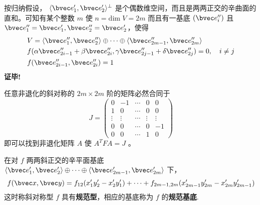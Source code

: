 按归纳假设， $\langle\bvec e'_1,\bvec e'_2\rangle^{\perp}$ 是个偶数维空间，而且是两两正交的辛曲面的直和。可知有某个整数 $m$ 使 $n=\mathrm{dim}\;V=2m$ 而且有一基底 $(\bvec e_i'')$ 且 $\bvec e''_1=\bvec e'_1,\bvec e''_2=\bvec e'_2$，使得
\begin{equation}
 \begin{aligned}
 &V=\langle\bvec e''_1,\bvec e''_2\rangle\oplus\cdots\oplus\langle\bvec e''_{2m-1},\bvec e''_{2m}\rangle\\
&f(\alpha\bvec e''_{2i-1}+\beta\bvec e''_{2i},\gamma\bvec e''_{2j-1}+\delta\bvec e''_{2j})=0,\quad i\neq j\\
 &f(\bvec e''_{2i-1},\bvec e''_{2i})=1
 \end{aligned}
 \end{equation}
 \textbf{证毕!}
 \begin{corollary}{}
 任意非退化的斜对称的 $2m\times2m$ 阶的矩阵必然合同于
 \begin{equation}
 J=\begin{pmatrix}
 0&-1&\cdots&0&0\\
 1&0&\cdots&0&0\\
 \vdots&\vdots&\cdots&\vdots&\vdots\\
 0&0&\cdots&0&-1\\
 0&0&\cdots&1&0
 \end{pmatrix}
 \end{equation}
 即可以找到非退化矩阵 $A$ 使 $A^{T}FA=J$ 。
 \end{corollary}
 在对 $f$ 两两斜正交的辛平面基底 $\langle\bvec e'_1,\bvec e'_2\rangle\oplus\cdots\oplus\langle\bvec e'_{2m-1},\bvec e'_{2m}\rangle$ 下，
 \begin{equation}
 f(\bvec x,\bvec y)=f_{12}(x'_1y'_2-x'_2y'_1)+\cdots+f_{2m-1,2m}(x'_{2m-1}y'_{2m}-x'_{2m}y'_{2m-1})
 \end{equation}
 这时称斜对称型 $f$ 具有\textbf{规范型}，相应的基底称为 $f$ 的\textbf{规范基底}.